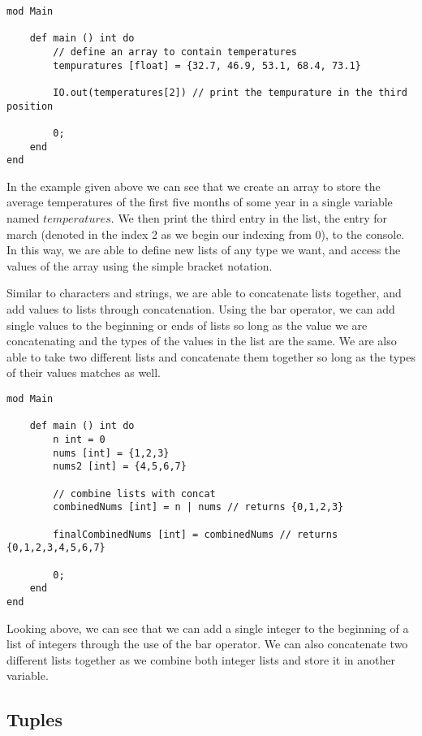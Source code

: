 \documentclass{article}
\begin{document}
\begin{lstlisting}
mod Main

	def main () int do
		// define an array to contain temperatures
		tempuratures [float] = {32.7, 46.9, 53.1, 68.4, 73.1}

		IO.out(temperatures[2]) // print the tempurature in the third position

		0;
	end
end
\end{lstlisting}

In the example given above we can see that we create an array to store the average temperatures of the first five months of some year in a single variable named $temperatures$.
We then print the third entry in the list, the entry for march (denoted in the index 2 as we begin our indexing from 0), to the console. In this way, we are able to define
new lists of any type we want, and access the values of the array using the simple bracket notation.

Similar to characters and strings, we are able to concatenate lists together, and add values to lists through concatenation. Using the bar operator, we can add single
values to the beginning or ends of lists so long as the value we are concatenating and the types of the values in the list are the same. We are also able to take two
different lists and concatenate them together so long as the types of their values matches as well.

\begin{lstlisting}
mod Main

	def main () int do
		n int = 0
		nums [int] = {1,2,3}
		nums2 [int] = {4,5,6,7}

		// combine lists with concat
		combinedNums [int] = n | nums // returns {0,1,2,3}

		finalCombinedNums [int] = combinedNums // returns {0,1,2,3,4,5,6,7}

		0;
	end
end
\end{lstlisting}

Looking above, we can see that we can add a single integer to the beginning of a list of integers through the use of the bar operator. We can also concatenate two
different lists together as we combine both integer lists and store it in another variable.


\subsection{Tuples}
\end{document}
